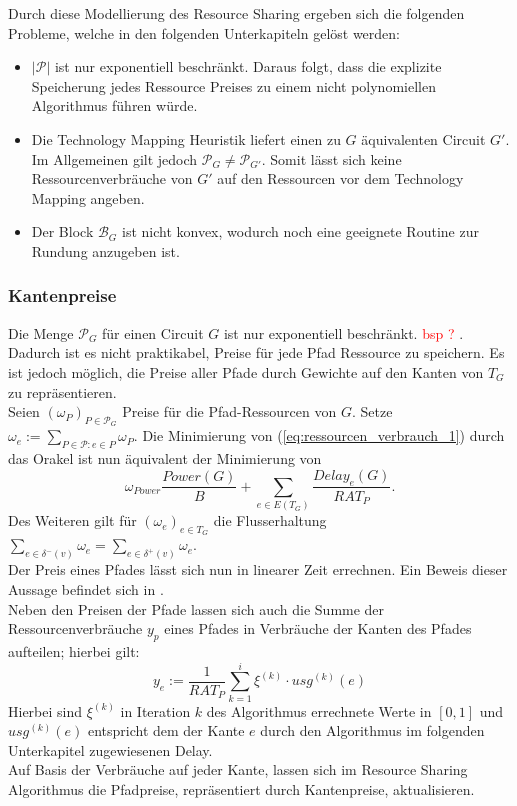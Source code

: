 \documentclass[11pt, a4paper, german]{article}
\newcommand{\TM}{Technology  Mapping }
\begin{document}
Durch diese Modellierung des Resource Sharing ergeben sich die folgenden Probleme, welche in den folgenden Unterkapiteln gelöst werden: \\
\begin{itemize}
	\item $|\mathcal{P}|$ ist nur exponentiell beschränkt. Daraus folgt, dass die explizite Speicherung jedes Ressource Preises zu einem nicht polynomiellen Algorithmus führen würde. 
	\item Die \TM Heuristik liefert einen zu $G$ äquivalenten Circuit $G'$. Im Allgemeinen gilt jedoch $\mathcal{P}_G \neq \mathcal{P}_{G'}$. Somit lässt sich keine Ressourcenverbräuche von $G'$ auf den Ressourcen vor dem \TM angeben.
	\item Der Block $\mathcal{B}_G$ ist nicht konvex, wodurch noch eine geeignete Routine zur Rundung anzugeben ist.
\end{itemize}

\subsubsection{Kantenpreise}\label{subsubsec:kantenpreise}
Die Menge $\mathcal{P}_G$ für einen Circuit $G$ ist nur exponentiell beschränkt. \textcolor{red}{bsp ? }. Dadurch ist es nicht praktikabel, Preise für jede Pfad Ressource zu speichern. Es ist jedoch möglich, die Preise aller Pfade durch Gewichte auf den Kanten von $T_G$ zu repräsentieren. \\
Seien $(\omega _P)_{P \in \mathcal{P}_G}$ Preise für die Pfad-Ressourcen von $G$. Setze $\omega _e := \sum\limits_{P \in \mathcal{P} : e \in P} \omega _P$.  Die Minimierung von (\ref{eq:ressourcen_verbrauch_1}) durch das Orakel ist nun äquivalent der Minimierung von 
\begin{equation}\label{eq:ressourcen_verbrauch_2}
\omega _{Power} \frac{Power(G)}{B} + \sum\limits_{e \in E(T_G)} \frac{Delay_e(G)}{RAT_P}.
\end{equation}
Des Weiteren gilt für $(\omega_e)_{e \in T_G}$ die Flusserhaltung $\sum_{e \in  \delta^- (v)} \omega_e = \sum_{e \in  \delta^+ (v)} \omega_e $.\\

Der Preis eines Pfades lässt sich nun in linearer Zeit errechnen. Ein Beweis dieser Aussage befindet sich in \cite{Haehnle2015}.\\
Neben den Preisen der Pfade lassen sich auch die Summe der Ressourcenverbräuche $y_p$ eines Pfades in Verbräuche der Kanten des Pfades aufteilen; hierbei gilt: 
\[y_e := \frac{1}{RAT_P} \sum\limits_{k=1}^i \xi^{(k)} \cdot usg^{(k)}(e)\]
Hierbei sind $\xi^{(k)}$ in Iteration $k$ des Algorithmus errechnete Werte in $[0,1]$ und $usg^{(k)}(e)$ entspricht dem der Kante $e$ durch den Algorithmus im folgenden Unterkapitel zugewiesenen Delay.\\
Auf Basis der Verbräuche auf jeder Kante, lassen sich im Resource Sharing Algorithmus die Pfadpreise, repräsentiert durch Kantenpreise,  aktualisieren. \\
\end{document}
